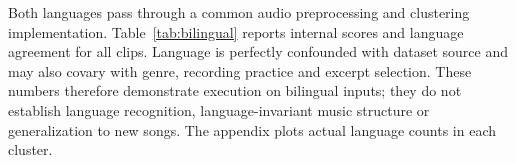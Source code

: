 
Both languages pass through a common audio preprocessing and clustering implementation. Table~\ref{tab:bilingual} reports internal scores and language agreement for all clips. Language is perfectly confounded with dataset source and may also covary with genre, recording practice and excerpt selection. These numbers therefore demonstrate execution on bilingual inputs; they do not establish language recognition, language-invariant music structure or generalization to new songs. The appendix plots actual language counts in each cluster.
